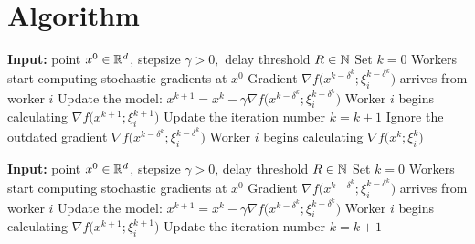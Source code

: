 \documentclass{article}
\begin{document}
\section{Algorithm}
% 
% 
% 
\begin{algorithm}[H]
    \caption{\ringmaster (without calculation stops)}
    \label{alg:ringmasternew}
    \begin{algorithmic}[1]
        \STATE \textbf{Input:} point $x^0 \in \mathbb{R}^d$, stepsize $\gamma > 0,$ delay threshold $R \in \mathbb{N}$
        \STATE Set $k = 0$
        \STATE Workers start computing stochastic gradients at $x^0$
            \STATE Gradient $\nabla f\big(x^{k-\delta^k}; \xi^{k-\delta^k}_{i}\big)$ arrives from worker $i$
            \highlightcolor
                \color{black}
                \STATE Update the model:
                    $x^{k+1} = x^{k} - \gamma \nabla f\big(x^{k-\delta^k}; \xi^{k-\delta^k}_{i}\big)$
                \STATE Worker $i$ begins calculating 
                    $\nabla f\big(x^{k+1}; \xi^{k+1}_{i}\big)$
                \STATE Update the iteration number $k = k + 1$
            \ELSE
                \STATE Ignore the outdated gradient 
                    $\nabla f\big(x^{k-\delta^k}; \xi^{k-\delta^k}_{i}\big)$
                \STATE Worker $i$ begins calculating 
                    $\nabla f\big(x^{k}; \xi^{k}_{i}\big)$
            \ENDIF
        \ENDWHILE
    \end{algorithmic}
\end{algorithm}
% 
% 
\begin{algorithm}[H]
    \caption{\ringmaster (with calculation stops)}
    \label{alg:ringmasternewstops}
    \begin{algorithmic}[1]
        \STATE \textbf{Input:} point $x^0 \in \mathbb{R}^d$, stepsize $\gamma > 0$, delay threshold $R \in \mathbb{N}$
        \STATE Set $k = 0$
        \STATE Workers start computing stochastic gradients at $x^0$
            \STATE Gradient $\nabla f\big(x^{k-\delta^k}; \xi^{k-\delta^k}_{i}\big)$ arrives from worker $i$
            \STATE Update the model:
                $x^{k+1} = x^{k} - \gamma \nabla f\big(x^{k-\delta^k}; \xi^{k-\delta^k}_{i}\big)$
            \STATE Worker $i$ begins calculating 
                $\nabla f\big(x^{k+1}; \xi^{k+1}_{i}\big)$
            \STATE Update the iteration number $k = k + 1$
        \ENDWHILE
    \end{algorithmic}
\end{algorithm}
% 
% 
\end{document}
